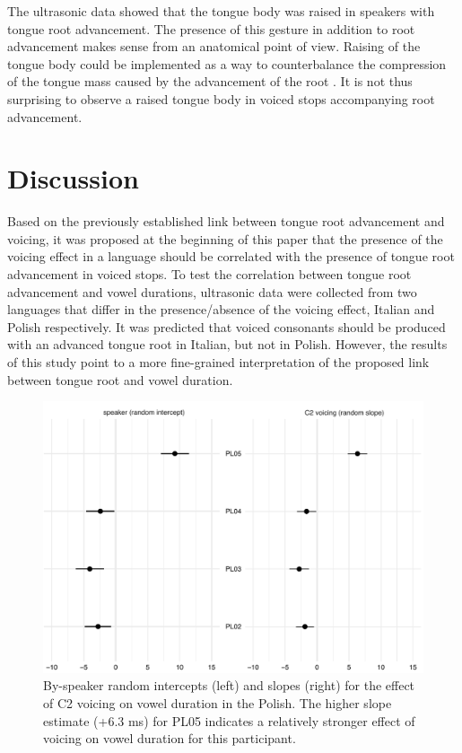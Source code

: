 \documentclass[authoryear, twocolumn]{elsarticle}
\begin{document}
The ultrasonic data showed that the tongue body was raised in speakers
with tongue root advancement. The presence of this gesture in addition
to root advancement makes sense from an anatomical point of view.
Raising of the tongue body could be implemented as a way to
counterbalance the compression of the tongue mass caused by the
advancement of the root
\citep{perkell1969, jackson1988, kingston1997, fulop1998}. It is not
thus surprising to observe a raised tongue body in voiced stops
accompanying root advancement.

\section{Discussion}\label{discussion}

\label{s:discussion}

Based on the previously established link between tongue root advancement
and voicing, it was proposed at the beginning of this paper that the
presence of the voicing effect in a language should be correlated with
the presence of tongue root advancement in voiced stops. To test the
correlation between tongue root advancement and vowel durations,
ultrasonic data were collected from two languages that differ in the
presence/absence of the voicing effect, Italian and Polish respectively.
It was predicted that voiced consonants should be produced with an
advanced tongue root in Italian, but not in Polish. However, the results
of this study point to a more fine-grained interpretation of the
proposed link between tongue root and vowel duration.

\begin{figure}
    \centering
    \includegraphics[height=.35\textwidth]{fig/polish-re.pdf}
    \caption{By-speaker random intercepts (left) and slopes (right) for the effect of C2 voicing on vowel duration in the Polish. The higher slope estimate (+6.3 ms) for PL05 indicates a relatively stronger effect of voicing on vowel duration for this participant.}
    \label{f:polish-re}
\end{figure}
\end{document}
